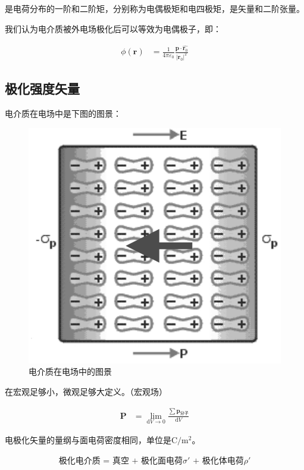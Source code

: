 \documentclass[12pt,onecolumn,a4paper]{book}
\numberwithin{table}{subsection}
\numberwithin{equation}{subsection}
\begin{document}
是电荷分布的一阶和二阶矩，分别称为电偶极矩和电四极矩，是矢量和二阶张量。

我们认为电介质被外电场极化后可以等效为电偶极子，即：

\begin{align}
    \phi(\mathbf{r}) & =\frac{1}{4 \pi \varepsilon_0} \frac{\mathbf{p} \cdot \hat{\mathbf{r}_0}}{|\mathbf{r}_0 |^2}
\end{align}

\subsection{极化强度矢量}

电介质在电场中是下图的图景：

\begin{figure}[ht]
    \centering
    \includegraphics[scale=0.2]{pic/2.5.1.png}
    \caption{电介质在电场中的图景}
\end{figure}

在宏观足够小，微观足够大定义。（宏观场）

\begin{align}
    \mathbf{P} & = \lim_{\mathrm{d} V \rightarrow 0} \frac{\sum \mathbf{p}_\text{分子}}{\mathrm{d} V}
\end{align}

电极化矢量的量纲与面电荷密度相同，单位是$\mathrm{C/m^2}$。

\begin{align}
    \text{极化电介质 = 真空 + 极化面电荷$\sigma'$ + 极化体电荷$\rho'$}
\end{align}
\end{document}
